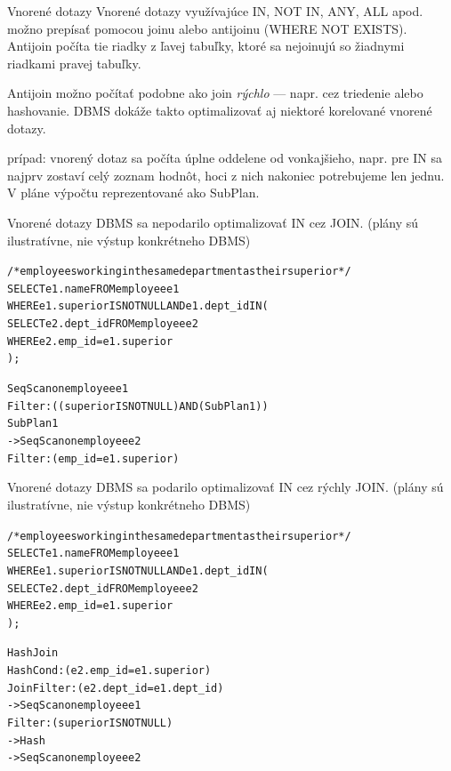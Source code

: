 \documentclass[12pt]{beamer}
\begin{document}
\begin{frame}[fragile]{Vnorené dotazy}
Vnorené dotazy využívajúce IN, NOT IN, ANY, ALL apod. možno prepísať pomocou joinu alebo \alert{antijoinu} (WHERE NOT EXISTS).
Antijoin počíta tie riadky z ľavej tabuľky, ktoré sa nejoinujú so žiadnymi riadkami pravej tabuľky.
\bigskip

Antijoin možno počítať podobne ako join \emph{rýchlo} --- napr. cez triedenie alebo hashovanie.
DBMS dokáže takto optimalizovať aj niektoré korelované vnorené dotazy.
\bigskip

 prípad: vnorený dotaz sa počíta úplne oddelene od vonkajšieho,
napr. pre IN sa najprv zostaví celý zoznam hodnôt, hoci z nich nakoniec potrebujeme len jednu.
V pláne výpočtu reprezentované ako \alert{SubPlan}.
\end{frame}

\begin{frame}[fragile]{Vnorené dotazy}
DBMS sa \alert{nepodarilo} optimalizovať IN cez JOIN.
\medskip
{\footnotesize (plány sú ilustratívne, nie výstup konkrétneho DBMS)}
\medskip

\begin{scriptsize}
\begin{alltt}
/* employees working in the same department as their superior */
SELECT e1.name FROM employee e1
WHERE e1.superior IS NOT NULL AND e1.dept_id IN (
    SELECT e2.dept_id FROM employee e2
    WHERE e2.emp_id = e1.superior
);
\end{alltt}
\end{scriptsize}
\smallskip
\begin{small}
\begin{alltt}
Seq Scan on employee e1
  Filter: ((superior IS NOT NULL) AND (SubPlan 1))
  \alert{SubPlan} 1
    ->  Seq Scan on employee e2
        Filter: (emp_id = e1.superior)


\end{alltt}
\end{small}
\end{frame}

\begin{frame}[fragile]{Vnorené dotazy}
DBMS sa \alert{podarilo} optimalizovať IN cez rýchly JOIN.
\medskip
{\footnotesize (plány sú ilustratívne, nie výstup konkrétneho DBMS)}
\medskip

\begin{scriptsize}
\begin{alltt}
/* employees working in the same department as their superior */
SELECT e1.name FROM employee e1
WHERE e1.superior IS NOT NULL AND e1.dept_id IN (
    SELECT e2.dept_id FROM employee e2
    WHERE e2.emp_id = e1.superior
);
\end{alltt}
\end{scriptsize}
\smallskip
\begin{small}
\begin{alltt}
\alert{Hash Join}
  Hash Cond: (e2.emp_id = e1.superior)
  Join Filter: (e2.dept_id = e1.dept_id)
  ->  Seq Scan on employee e1
        Filter: (superior IS NOT NULL)
  ->  Hash
        ->  Seq Scan on employee e2
\end{alltt}
\end{small}
\end{frame}
\end{document}
